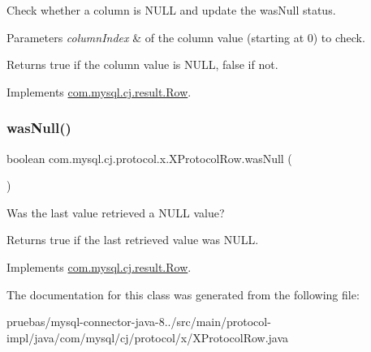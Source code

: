 Check whether a column is N\+U\+LL and update the \textquotesingle{}was\+Null\textquotesingle{} status.


\begin{DoxyParams}{Parameters}
{\em column\+Index} & of the column value (starting at 0) to check.\\
\hline
\end{DoxyParams}
\begin{DoxyReturn}{Returns}
true if the column value is N\+U\+LL, false if not. 
\end{DoxyReturn}


Implements \mbox{\hyperlink{interfacecom_1_1mysql_1_1cj_1_1result_1_1_row_aaf07357d53c30067dfa87183a1e60a18}{com.\+mysql.\+cj.\+result.\+Row}}.

\mbox{\label{classcom_1_1mysql_1_1cj_1_1protocol_1_1x_1_1_x_protocol_row_ae6fd328d9a5ac92bdbb910fb9c8c043a}} 
\subsubsection{\texorpdfstring{was\+Null()}{wasNull()}}
{\footnotesize\ttfamily boolean com.\+mysql.\+cj.\+protocol.\+x.\+X\+Protocol\+Row.\+was\+Null (\begin{DoxyParamCaption}{ }\end{DoxyParamCaption})}

Was the last value retrieved a N\+U\+LL value?

\begin{DoxyReturn}{Returns}
true if the last retrieved value was N\+U\+LL. 
\end{DoxyReturn}


Implements \mbox{\hyperlink{interfacecom_1_1mysql_1_1cj_1_1result_1_1_row_a6a915f3dfaf8f9997f705b7762f9c6cb}{com.\+mysql.\+cj.\+result.\+Row}}.



The documentation for this class was generated from the following file\+:\begin{DoxyCompactItemize}
\item 
pruebas/mysql-\/connector-\/java-\/8../src/main/protocol-\/impl/java/com/mysql/cj/protocol/x/X\+Protocol\+Row.\+java\end{DoxyCompactItemize}
